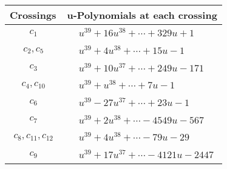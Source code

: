 \documentclass[1p]{elsarticle_modified}
\theoremstyle{definition}
\begin{document}
\begin{tabular}{m{50pt}|m{274pt}}
Crossings & \hspace{64pt}u-Polynomials at each crossing \\
\hline $$\begin{aligned}c_{1}\end{aligned}$$&$\begin{aligned}
&u^{39}+16 u^{38}+\cdots+329 u+1
\end{aligned}$\\
\hline $$\begin{aligned}c_{2},c_{5}\end{aligned}$$&$\begin{aligned}
&u^{39}+4 u^{38}+\cdots+15 u-1
\end{aligned}$\\
\hline $$\begin{aligned}c_{3}\end{aligned}$$&$\begin{aligned}
&u^{39}+10 u^{37}+\cdots+249 u-171
\end{aligned}$\\
\hline $$\begin{aligned}c_{4},c_{10}\end{aligned}$$&$\begin{aligned}
&u^{39}+u^{38}+\cdots+7 u-1
\end{aligned}$\\
\hline $$\begin{aligned}c_{6}\end{aligned}$$&$\begin{aligned}
&u^{39}-27 u^{37}+\cdots+23 u-1
\end{aligned}$\\
\hline $$\begin{aligned}c_{7}\end{aligned}$$&$\begin{aligned}
&u^{39}+2 u^{38}+\cdots-4549 u-567
\end{aligned}$\\
\hline $$\begin{aligned}c_{8},c_{11},c_{12}\end{aligned}$$&$\begin{aligned}
&u^{39}+4 u^{38}+\cdots-79 u-29
\end{aligned}$\\
\hline $$\begin{aligned}c_{9}\end{aligned}$$&$\begin{aligned}
&u^{39}+17 u^{37}+\cdots-4121 u-2447
\end{aligned}$\\
\hline
\end{tabular}\\~\\
\end{document}
